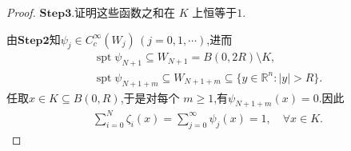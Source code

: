 \documentclass[../../main.tex]{subfiles}
\begin{document}
\begin{proof}
\noindent$\mathbf{Step}\mathbf{3}.${\heiti 证明这些函数之和在 $K$ 上恒等于$1$.}

由\noindent$\mathbf{Step}\mathbf{2}$知$\psi_j\in C_c^\infty(W_j)\,(j=0,1,\cdots)$,进而
\begin{gather*}
\operatorname{spt}\psi_{N+1}
\subseteq W_{N+1}
=B(0,2R)\setminus K,\\
\operatorname{spt}\psi_{N+1+m}
\subseteq W_{N+1+m}
\subseteq\{y\in\mathbb{R}^{n}:|y|>R\}.
\end{gather*}
任取$x\in K\subseteq B(0,R)$,于是对每个 $m\geqslant1$,有$\psi_{N+1+m}(x)=0$.因此
\begin{align*}
\sum\limits_{i=0}^{N}\zeta_i(x)
=\sum\limits_{j=0}^{\infty}\psi_j(x)
=1,\quad \forall x\in K.
\end{align*}
\end{proof}
\end{document}
